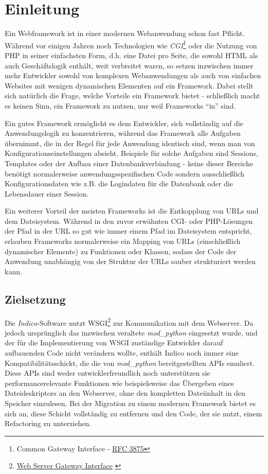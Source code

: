 \chapter{Einleitung}

Ein Webframework ist in einer modernen Webanwendung schon fast Pflicht. Während vor einigen
Jahren noch Technologien wie \emph{CGI}\footnote{Common Gateway Interface -
\href{http://www.ietf.org/rfc/rfc3875}{RFC 3875}\citep{rfc3875}} oder die Nutzung von PHP in seiner
einfachsten Form, d.h. eine Datei pro Seite, die sowohl HTML als auch Geschäftslogik enthält, weit
verbreitet waren, so setzen inzwischen immer mehr Entwickler sowohl von komplexen Webanwendungen als
auch von einfachen Websites mit wenigen dynamischen Elementen auf ein Framework. Dabei stellt sich
natürlich die Frage, welche Vorteile ein Framework bietet - schließlich macht es keinen Sinn, ein
Framework zu nutzen, nur weil Frameworks \enquote{in} sind.

Ein gutes Framework ermöglicht es dem Entwickler, sich vollständig auf die Anwendungslogik zu
konzentrieren, während das Framework alle Aufgaben übernimmt, die in der Regel für jede Anwendung
identisch sind, wenn man von Konfigurationseinstellungen absieht. Beispiele für solche Aufgaben sind
Sessions, Templates oder der Aufbau einer Datenbankverbindung - keine dieser Bereiche benötigt
normalerweise anwendungsspezifischen Code sondern ausschließlich Konfigurationsdaten wie z.B. die
Logindaten für die Datenbank oder die Lebensdauer einer Session.

Ein weiterer Vorteil der meisten Frameworks ist die Entkopplung von URLs und dem Dateisystem.
Während in den zuvor erwähnten CGI- oder PHP-Lösungen der Pfad in der URL so gut wie immer einem
Pfad im Dateisystem entspricht, erlauben Frameworks normalerweise ein Mapping von URLs
(einschließlich dynamischer Elemente) zu Funktionen oder Klassen, sodass der Code der Anwendung
unabhängig von der Struktur der URLs sauber strukturiert werden kann.


\section{Zielsetzung}

Die \emph{Indico}-Software nutzt WSGI\footnote{\href{http://www.python.org/dev/peps/pep-0333/}{Web
Server Gateway Interface} \citep{wsgi}} zur Kommunikation mit dem Webserver. Da jedoch ursprünglich
das inzwischen veraltete \emph{mod\_python} eingesetzt wurde, und der für die Implementierung von
WSGI zuständige Entwickler darauf aufbauenden Code nicht verändern wollte, enthält Indico noch immer
eine Kompatibilitätsschickt, die die von \emph{mod\_python} bereitgestellten APIs emuliert. Diese
APIs sind weder entwicklerfreundlich noch unterstützen sie performancerelevante Funktionen wie
beispielsweise das Übergeben eines Dateideskriptors an den Webserver, ohne den kompletten
Dateiinhalt in den Speicher einzulesen. Bei der Migration zu einem modernen Framework bietet es sich
an, diese Schicht vollständig zu entfernen und den Code, der sie nutzt, einem Refactoring zu
unterziehen.

